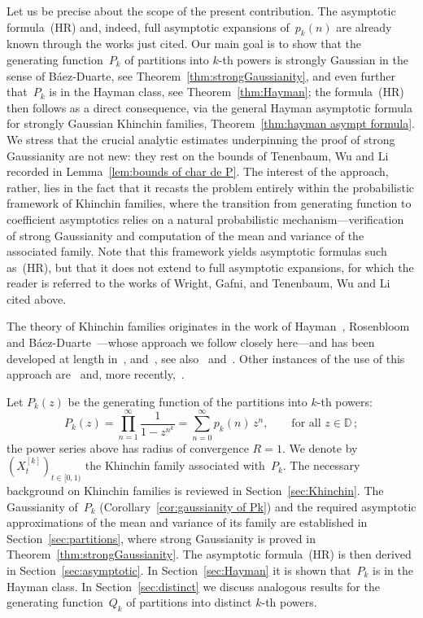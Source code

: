 \documentclass[12pt]{amsart}
\theoremstyle{definition}
\begin{document}
Let us be precise about the scope of the present contribution. The asymptotic formula~(HR) and, indeed, full asymptotic expansions of~$p_k(n)$ are already known through
the works just cited. Our main goal is to show that the generating function~$P_k$ of partitions
into $k$-th powers is strongly Gaussian in the sense of B\'aez-Duarte, see Theorem~\ref{thm:strongGaussianity}, and
even further that~$P_k$ is in the Hayman class, see Theorem~\ref{thm:Hayman}; the formula~(HR) then
follows as a direct consequence, via the general Hayman asymptotic formula for strongly
Gaussian Khinchin families, Theorem~\ref{thm:hayman asympt formula}. We stress that the crucial analytic estimates underpinning the proof of strong Gaussianity are not new: they rest on the
bounds of Tenenbaum, Wu and Li recorded in Lemma~\ref{lem:bounds of char de P}. The interest of the approach,
rather, lies in the fact that it recasts the problem entirely within the probabilistic framework
of Khinchin families, where the transition from generating function to coefficient asymptotics relies on  a natural  probabilistic mechanism---verification of
strong Gaussianity and computation of the mean and variance of the associated family.
Note that this framework yields asymptotic formulas such as~(HR),
but that it does not extend to full asymptotic expansions, for which the reader is referred to
the works of Wright, Gafni, and Tenenbaum, Wu and Li cited above.
\smallskip

The theory of Khinchin families originates in the work of Hayman~\cite{Hayman}, Rosenbloom~\cite{Rosenbloom}
and B\'aez-Duarte~\cite{BaezDuarte}---whose approach we follow closely here---and has been developed
at length in~\cite{CFMK}, \cite{CFMK2} and~\cite{CFMK3}, see also~\cite{MaciaThesis} and~\cite{MaciaGaussianity}. Other instances of the use of this
approach are~\cite{CandelpergherMiniconi} and, more recently,~\cite{Ikeda}.
\smallskip

Let $P_k(z)$ be the generating function of the partitions into $k$-th powers:
\[
P_k(z) = \prod_{n=1}^{\infty} \frac{1}{1-z^{n^k}} = \sum_{n=0}^{\infty} p_k(n)\, z^n, \qquad \text{for all } z\in\mathbb{D}\,;
\]
the power series above has radius of convergence $R=1$. We denote by $(X^{[k]}_t)_{t\in[0,1)}$ the
Khinchin family associated with~$P_k$. The necessary background on Khinchin families is
reviewed in Section~\ref{sec:Khinchin}. The Gaussianity of~$P_k$ (Corollary~\ref{cor:gaussianity of Pk}) and the required asymptotic
approximations of the mean and variance of its family are established in Section~\ref{sec:partitions},
where strong Gaussianity is proved in Theorem~\ref{thm:strongGaussianity}. The asymptotic formula~(HR) is
then derived in Section~\ref{sec:asymptotic}. In Section~\ref{sec:Hayman} it is shown that~$P_k$ is in the Hayman class. In Section~\ref{sec:distinct} we discuss analogous results for the generating function~$Q_k$ of partitions into distinct $k$-th powers.
\end{document}
